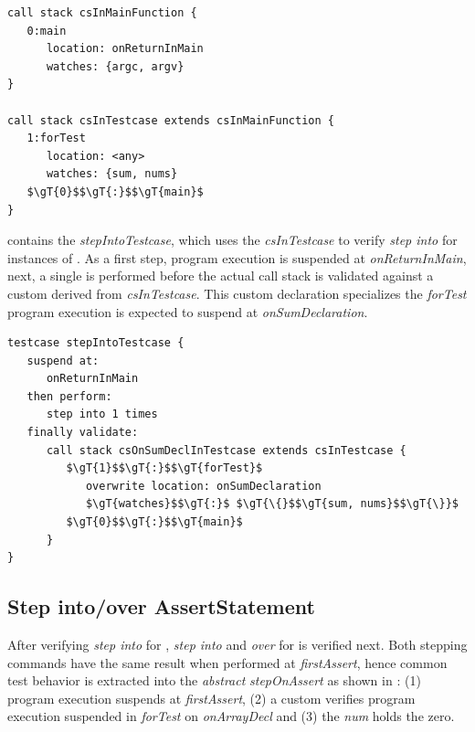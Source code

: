 \begin{lstlisting}[language=testingDSL,caption=\ic{CallStack} declarations,
label=lst:callStacks]
call stack csInMainFunction {
   0:main
      location: onReturnInMain
      watches: {argc, argv}                     
}

call stack csInTestcase extends csInMainFunction {
   1:forTest
      location: <any>
      watches: {sum, nums}                  
   $\gT{0}$$\gT{:}$$\gT{main}$
}
\end{lstlisting}

 contains the 
\emph{stepIntoTestcase}, which uses the  \emph{csInTestcase}
to verify \emph{step into} for instances of . As
a first step, program execution is suspended at \emph{onReturnInMain}, next, a
single  is performed before the actual call stack is validated against
a custom  derived from \emph{csInTestcase}.
This custom declaration specializes the 
\emph{forTest} \ie program execution is expected to suspend at
\emph{onSumDeclaration}.

\begin{lstlisting}[language=testingDSL,label=lst:stepIntoTestcase,
caption=\emph{Step into} \ic{ExecuteTestExpression}]
testcase stepIntoTestcase {            
   suspend at: 
      onReturnInMain
   then perform:                         
      step into 1 times    
   finally validate:                         
      call stack csOnSumDeclInTestcase extends csInTestcase {
         $\gT{1}$$\gT{:}$$\gT{forTest}$
            overwrite location: onSumDeclaration
            $\gT{watches}$$\gT{:}$ $\gT{\{}$$\gT{sum, nums}$$\gT{\}}$
         $\gT{0}$$\gT{:}$$\gT{main}$                       
      }
}
\end{lstlisting}
\vspace{-1mm}
\subsection{Step into/over AssertStatement}

After verifying \emph{step into} for , 
\emph{step into} and \emph{over} for  is verified
next. Both stepping commands have the same result when performed at
\emph{firstAssert}, hence common test behavior is extracted into the
\emph{abstract}  \emph{stepOnAssert} as shown in
: (1) program
execution suspends at \emph{firstAssert}, (2) a custom  verifies 
program execution suspended in \emph{forTest} on \emph{onArrayDecl} and
(3) the  \emph{num} holds the  zero.
 
